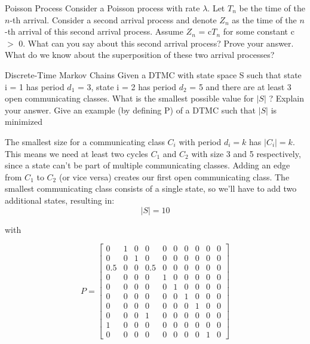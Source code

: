 \begin{problem}{Poisson Process}
Consider a Poisson process with rate $\lambda$. Let $T_n$ be the time of the $n$-th arrival. Consider a second arrival process and denote $Z_n$ as the time of the $n$-th arrival of this second arrival process. Assume $Z_n$ = c$T_n$ for some constant c $>$ 0. What can you say about this second arrival process? Prove your answer. What do we know about the superposition of these two arrival processes?
\end{problem}

\begin{problem}{Discrete-Time Markov Chains}
Given a DTMC with state space S such that state i = 1 has period $d_1$ = 3, state i = 2 has period $d_2$ = 5 and there are at least 3 open communicating classes. What is the smallest possible value for $| S |$  ? Explain your answer. Give an example (by defining P) of a DTMC such that $| S |$ is minimized
\end{problem}

\begin{solution}
  The smallest size for a communicating class $C_i$ with period $d_i=k$ has $|C_i|=k$. This means we need at least two cycles $C_1$ and $C_2$ with size 3 and 5 respectively, since a state can't be part of multiple communicating classes. Adding an edge from $C_1$ to $C_2$ (or vice versa) creates our first open communicating class. The smallest communicating class consists of a single state, so we'll have to add two additional states, resulting in:
  \[
  \boxed{| S | = 10}
  \]
\end{solution}

with

\[
P =
\begin{bmatrix}
  0 & 1 & 0 & 0 & 0 & 0 & 0 & 0 & 0 & 0 \\
  0 & 0 & 1 & 0 & 0 & 0 & 0 & 0 & 0 & 0 \\
  0.5 & 0 & 0 & 0.5 & 0 & 0 & 0 & 0 & 0 & 0 \\
  0 & 0 & 0 & 0 & 1 & 0 & 0 & 0 & 0 & 0 \\
  0 & 0 & 0 & 0 & 0 & 1 & 0 & 0 & 0 & 0 \\
  0 & 0 & 0 & 0 & 0 & 0 & 1 & 0 & 0 & 0 \\
  0 & 0 & 0 & 0 & 0 & 0 & 0 & 1 & 0 & 0 \\
  0 & 0 & 0 & 1 & 0 & 0 & 0 & 0 & 0 & 0 \\
  1 & 0 & 0 & 0 & 0 & 0 & 0 & 0 & 0 & 0 \\
  0 & 0 & 0 & 0 & 0 & 0 & 0 & 0 & 1 & 0
\end{bmatrix}
\]

